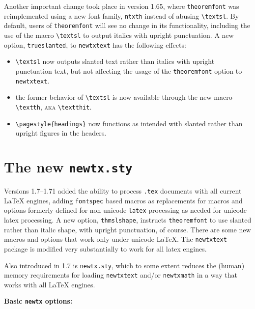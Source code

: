 \documentclass[\fsc]{article}
\theoremstyle{oldplain}
\theoremstyle{plain}
\begin{document}
Another important change took place in version 1.65, where  {\tt theoremfont} was reimplemented using a new font family, {\tt ntxth} instead of abusing \verb|\textsl|. By default,  users of {\tt theoremfont} will see no change in its functionality, including the use of the macro \verb|\textsl| to output italics with upright punctuation. A new option, {\tt trueslanted}, to {\tt newtxtext} has the following effects:
\begin{itemize}
\item
\verb|\textsl| now outputs slanted text rather than italics with upright punctuation text, but not affecting the usage of the {\tt theoremfont} option to {\tt newtxtext}.
\item the former behavior of \verb|\textsl| is now available through the new macro \verb|\textth|, \textsc{aka} \verb|\textthit|.
\item \verb|\pagestyle{headings}| now functions as intended with slanted rather than upright figures in the headers.
\end{itemize}
\section{The new {\tt newtx.sty}}
Versions 1.7--1.71 added the ability to process {\tt.tex} documents with all current LaTeX engines, adding {\tt fontspec} based macros as replacements for macros and options formerly defined for non-unicode {\tt latex} processing as needed for unicode latex processing. A new option, {\tt thmslshape}, instructs {\tt theoremfont} to use slanted rather than italic shape, with upright punctuation, of course. There are some new macros and options that work only under unicode LaTeX. The {\tt newtxtext} package is modified very substantially to work for all latex engines. 

Also introduced in 1.7 is {\tt newtx.sty}, which to some extent reduces the (human) memory requirements for loading {\tt newtxtext} and/or {\tt newtxmath} in a way that works with all LaTeX engines. 

\textbf{Basic {\tt newtx} options:}
 
\end{document}
